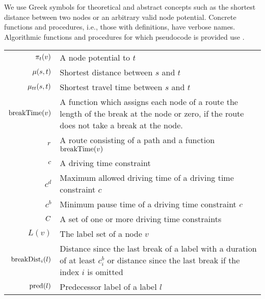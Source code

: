 We use Greek symbols for theoretical and abstract concepts such as the shortest distance between two nodes or an arbitrary valid node potential. Concrete functions and procedures, i.e., those with definitions, have verbose names. Algorithmic functions and procedures for which pseudocode is provided use .

\begin{tabular}{rp{}}
	$\pi_t(v)$         & A node potential to $t$                                                                                                                    \\
	$\mu(s,t)$          & Shortest distance between $s$ and $t$                                                                                                      \\
	$\mu_{tt}(s,t)$        & Shortest travel time between $s$ and $t$                                                                                                   \\
	$\operatorname{breakTime}(v)$           & A function which assigns each node of a route the length of the break at the node or zero, if the route does not take a break at the node.
	\\
	$r$                  & A route consisting of a path and a function $\operatorname{breakTime}(v)$                                                                                \\
	$c$                  & A driving time constraint                                                                                                                  \\
	$c^d$                     & Maximum allowed driving time of a driving time constraint $c$                                                                              \\
	$c^b$                     & Minimum pause time of a driving time constraint $c$                                                                                   \\
	$C$               & A set of one or more driving time constraints                                                                                              \\
	$L(v)$                    & The label set of a node $v$                                                                                                                \\
	$\operatorname{breakDist}_i(l)$         & Distance since the last break of a label with a duration of at least $c_i^b$ or distance since the last break if the index $i$ is omitted  \\
	$\operatorname{pred}(l)$                & Predecessor label of a label $l$                                                                                                           \\


\end{tabular}
